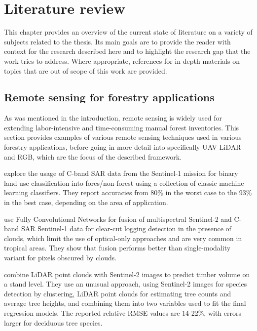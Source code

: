 \chapter{Literature review}\label{cap:literature}

This chapter provides an overview of the current state of literature on a variety of subjects related to the thesis.
Its main goals are to provide the reader with context for the research described here and to highlight the research gap that the work tries to address.
Where appropriate, references for in-depth materials on topics that are out of scope of this work are provided.

\section{Remote sensing for forestry applications}

As was mentioned in the introduction, remote sensing is widely used for extending labor-intensive and time-consuming manual forest inventories.
This section provides examples of various remote sensing techniques used in various forestry applications, before going in more detail into specifically UAV LiDAR and RGB, which are the focus of the described framework.

\citet{hansenAssessingForestNonForest2020} explore the usage of C-band SAR data from the Sentinel-1 mission for binary land use classification into fores/non-forest using a collection of classic machine learning classifiers.
They report accuracies from 80\% in the worst case to the 93\% in the best case, depending on the area of application.

\citet{ferrariFusingSentinel1Sentinel22023} use Fully Convolutional Networks \citep{longFullyConvolutionalNetworks2015} for fusion of multispectral Sentinel-2 and C-band SAR Sentinel-1 data for clear-cut logging detection in the presence of clouds, which limit the use of optical-only approaches and are very common in tropical areas.
They show that fusion performs better than single-modality variant for pixels obscured by clouds.

\citet{sinica-sinavskisForestStandVolume2022} combine LiDAR point clouds with Sentinel-2 images to predict timber volume on a stand level.
They use an unusual approach, using Sentinel-2 images for species detection by clustering, LiDAR point clouds for estimating tree counts and average tree heights, and combining them into two variables used to fit the final regression models.
The reported relative RMSE values are 14-22\%, with errors larger for deciduous tree species.

